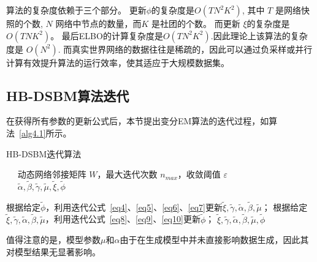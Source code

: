 
算法的复杂度依赖于三个部分。 更新$\phi$的复杂度是$O(TN^2K^2)$, 其中 $T$ 是网络快照的个数,  $N$ 网络中节点的数量，而$K$ 是社团的个数。 而更新 $\xi$的复杂度是$O(TNK^2)$。 最后ELBO的计算复杂度是$O(TN^2K^2)$.因此理论上该算法的复杂度是 $O(N^2)$. 而真实世界网络的数据往往是稀疏的，因此可以通过负采样或并行计算有效提升算法的运行效率，使其适应于大规模数据集。



\subsection{HB-DSBM算法迭代}

在获得所有参数的更新公式后，本节提出变分EM算法的迭代过程，如算法~\ref{alg4.1}所示。

\begin{algorithm}
	\caption{HB-DSBM迭代算法}\label{alg4.1}
	\algorithmicrequire ~~ 动态网络邻接矩阵 $W$，最大迭代次数 $n_{max}$，收敛阈值 $\varepsilon$ \\
	\algorithmicensure ~~ $\widetilde{\alpha}, \widetilde{\beta}, \widetilde{\gamma}, \widetilde{\mu}, \widetilde{\xi}, \widetilde{\phi}$ \\
	\begin{algorithmic}[1]
		\REPEAT
		\STATE 根据给定$\widetilde{\phi}$，利用迭代公式~\ref{eq4}、\ref{eq5}、\ref{eq6}、\ref{eq7}更新$\widetilde{\xi}, \widetilde{\gamma}, \widetilde{\alpha}, \widetilde{\beta}, \widetilde{\mu}$；
		\STATE 根据给定$\widetilde{\xi}, \widetilde{\gamma}, \widetilde{\alpha}, \widetilde{\beta}, \widetilde{\mu}$，利用迭代公式~\ref{eq8}、\ref{eq9}、\ref{eq10}更新$\widetilde{\phi}$；
		\RETURN $\widetilde{\xi}, \widetilde{\gamma}, \widetilde{\alpha}, \widetilde{\beta}, \widetilde{\mu}, \widetilde{\phi}$
	\end{algorithmic}
\end{algorithm}
值得注意的是，模型参数$\mu$和$\alpha$由于在生成模型中并未直接影响数据生成，因此其对模型结果无显著影响。

